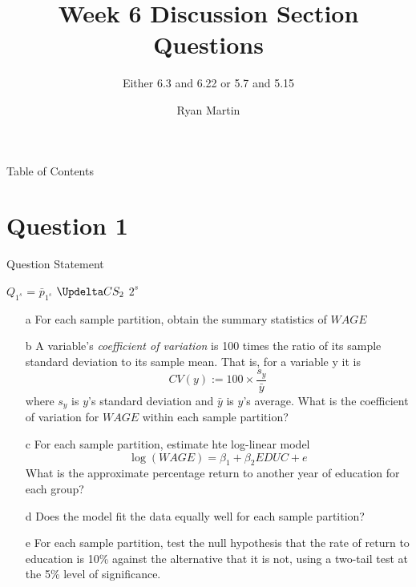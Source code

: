 \documentclass[xcolor={dvipsnames}]{beamer}
\title{ Week 6 Discussion Section Questions}
\subtitle{Either 6.3 and 6.22 or 5.7 and 5.15}
\author{Ryan Martin}
\begin{document}
	\maketitle


	\begin{frame}{Table of Contents}
		\tableofcontents
	\end{frame}

	\section{Question 1}
	
\begin{frame}[allowframebreaks]{5.7}
	Question Statement
	
	$Q_{1^s}$
	= $\bar{p}_{1^s}$
	$\Updelta CS_2$
	$2^s$
	
	\begin{itemize}
		\item[a] For each sample partition, obtain the summary statistics of $WAGE$

	

	\item[b] A variable's \textit{coefficient of variation} is 100 times the ratio of its sample standard deviation to its sample mean. That is, for a variable y it is $$CV(y):= 100 \times \frac{s_y}{\bar{y}}$$ where $s_y$ is $y$'s standard deviation and $\bar{y}$ is $y$'s average. What is the coefficient of variation for $WAGE$ within each sample partition?
	
	\item[c] For each sample partition, estimate hte log-linear model $$\log(WAGE) = \beta_1 + \beta_2 EDUC + e$$ What is the approximate percentage return to another year of education for each group?
	
	\item[d] Does the model fit the data equally well for each sample partition?
	
	\item[e] For each sample partition, test the null hypothesis that the rate of return to education is 10\% against the alternative that it is not, using a two-tail test at the 5\% level of significance.
\end{itemize}

\end{frame}
\end{document}
